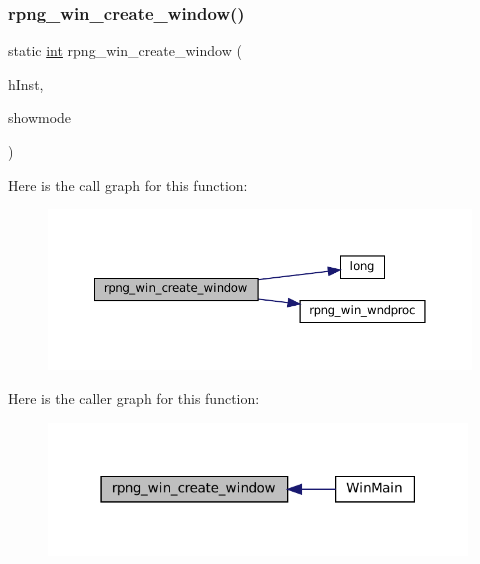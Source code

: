 \subsubsection{\texorpdfstring{rpng\+\_\+win\+\_\+create\+\_\+window()}{rpng\_win\_create\_window()}}
{\footnotesize\ttfamily static \mbox{\hyperlink{ioapi_8h_a787fa3cf048117ba7123753c1e74fcd6}{int}} rpng\+\_\+win\+\_\+create\+\_\+window (\begin{DoxyParamCaption}\item[{H\+I\+N\+S\+T\+A\+N\+CE}]{h\+Inst,  }\item[{\mbox{\hyperlink{ioapi_8h_a787fa3cf048117ba7123753c1e74fcd6}{int}}}]{showmode }\end{DoxyParamCaption})\hspace{0.3cm}{\ttfamily [static]}}

Here is the call graph for this function\+:
\nopagebreak
\begin{figure}[H]
\begin{center}
\leavevmode
\includegraphics[width=350pt]{rpng-win_8c_af3efd367c6a70336925006199ab430e6_cgraph}
\end{center}
\end{figure}
Here is the caller graph for this function\+:
\nopagebreak
\begin{figure}[H]
\begin{center}
\leavevmode
\includegraphics[width=315pt]{rpng-win_8c_af3efd367c6a70336925006199ab430e6_icgraph}
\end{center}
\end{figure}
\mbox{\label{rpng-win_8c_aaa8b69a6c5c9c2d35b7d67787a55e218}} 
